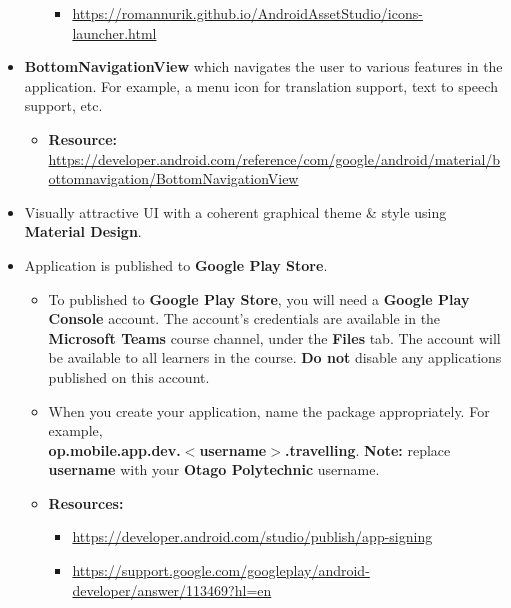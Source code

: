 \documentclass{article}
\begin{document}
\begin{itemize}
\begin{itemize}
\begin{itemize}
			            \item \footnotesize\href{https://romannurik.github.io/AndroidAssetStudio/icons-launcher.html}{https://romannurik.github.io/AndroidAssetStudio/icons-launcher.html}
		            \end{itemize}
	      \end{itemize}
	\item \textbf{BottomNavigationView} which navigates the user to various features in the application. For example, a menu icon for translation support, text to speech support, etc.
	      \begin{itemize}
		      \item \textbf{Resource:} \footnotesize\href{https://developer.android.com/reference/com/google/android/material/bottomnavigation/BottomNavigationView}{https://developer.android.com/reference/com/google/android/material/bottomnavigation/BottomNavigationView}
	      \end{itemize}
	\item Visually attractive UI with a coherent graphical theme \& style using \textbf{Material Design}.
	\item Application is published to \textbf{Google Play Store}.
	      \begin{itemize}
		      \item To published to \textbf{Google Play Store}, you will need a \textbf{Google Play Console} account. The account's credentials are available in the \textbf{Microsoft Teams} course channel, under the \textbf{Files} tab. The account will be available to all learners in the course. \textbf{Do not} disable any applications published on this account.
		      \item When you create your application, name the package appropriately. For example, \\ \textbf{op.mobile.app.dev.$<$username$>$.travelling}. \textbf{Note:} replace \textbf{username} with your \textbf{Otago Polytechnic} username.
		      \item \textbf{Resources:}
		            \begin{itemize}
									\item \footnotesize\href{https://developer.android.com/studio/publish/app-signing}{https://developer.android.com/studio/publish/app-signing}
			            \item \footnotesize\href{https://support.google.com/googleplay/android-developer/answer/113469?hl=en}{https://support.google.com/googleplay/android-developer/answer/113469?hl=en}
		            \end{itemize}

\end{itemize}
\end{itemize}
\end{document}
